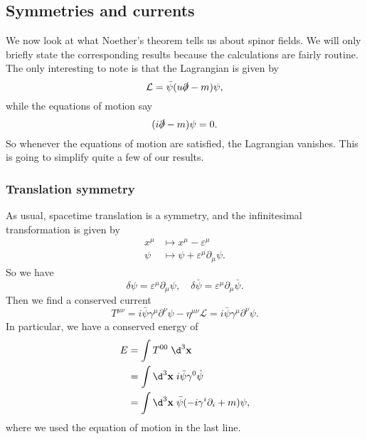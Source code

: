\documentclass[a4paper]{article}
\begin{document}
\subsection{Symmetries and currents}
We now look at what Noether's theorem tells us about spinor fields. We will only briefly state the corresponding results because the calculations are fairly routine. The only interesting to note is that the Lagrangian is given by
\[
  \mathcal{L} = \bar\psi (u \slashed\partial - m) \psi,
\]
while the equations of motion say
\[
  (i \slashed\partial - m)\psi = 0.
\]
So whenever the equations of motion are satisfied, the Lagrangian vanishes. This is going to simplify quite a few of our results.

\subsubsection*{Translation symmetry}
As usual, spacetime translation is a symmetry, and the infinitesimal transformation is given by
\begin{align*}
  x^\mu &\mapsto x^\mu - \varepsilon^\mu\\
  \psi &\mapsto \psi + \varepsilon^\mu \partial_\mu\psi.
\end{align*}
So we have
\[
  \delta \psi = \varepsilon^\mu \partial_\mu \psi,\quad \delta \bar\psi = \varepsilon^\mu \partial_\mu \bar\psi.
\]
Then we find a conserved current
\[
  T^{\mu\nu} = i \bar\psi \gamma^\mu \partial^\nu \psi - \eta^{\mu\nu}\mathcal{L} = i \bar\psi \gamma^\mu \partial^\nu \psi.
\]
In particular, we have a conserved energy of
\begin{align*}
  E &= \int T^{00}\;\d^3 \mathbf{x} \\
  &= \int \d^3 \mathbf{x}\; i \bar\psi \gamma^0 \dot\psi \\
  &= \int \d^3 \mathbf{x}\; \bar\psi(-i \gamma^i \partial_i + m)\psi,
\end{align*}
where we used the equation of motion in the last line.
\end{document}
